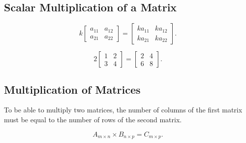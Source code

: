 \documentclass{article}
\begin{document}
\subsection{Scalar Multiplication of a Matrix}

\[
    k
    \begin{bmatrix} 
        a_{11} & a_{12} \\
        a_{21} & a_{22}
    \end{bmatrix} 
    =
    \begin{bmatrix} 
        ka_{11} & ka_{12} \\
        ka_{21} & ka_{22}
    \end{bmatrix}
.\] 

\begin{example}
    \[
        2
        \begin{bmatrix} 
            1 & 2 \\
            3 & 4
        \end{bmatrix} 
        =
        \begin{bmatrix} 
            2 & 4 \\
            6 & 8
        \end{bmatrix}
    .\]
\end{example}

\subsection{Multiplication of Matrices}

To be able to multiply two matrices, the number of columns of the first matrix must be equal to the number of rows of the second matrix.

\[
    A_{m\times n} \times B_{n\times p} = C_{m\times p}
.\] 
\end{document}
